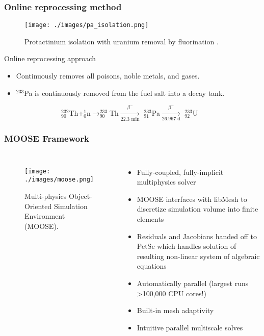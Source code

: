 \begin{frame}
  \frametitle{Online reprocessing method}
     \begin{figure}[t]
                \vspace*{-0.1in}
                \texttt{[image: ./images/pa\_isolation.png]}
                \vspace*{-0.09in}
                \caption{Protactinium isolation with uranium removal by fluorination \cite{robertson_conceptual_1971}.}
      \end{figure}
                      \vspace*{-0.22in}
             \begin{block}{Online reprocessing approach}
               \begin{itemize}             
               \item Continuously removes all poisons, noble metals, and gases.
               \item $^{233}$Pa is continuously removed from the fuel salt into a decay tank.
               \end{itemize}
               \end{block}
               \vspace{-0.05in}
$\qquad\qquad\qquad\qquad^{232}_{90}$Th+$^1_0$n$\rightarrow^{233}_{90}$Th$\xrightarrow[\text{22.3 min}]{\beta^-}$ $^{233}_{91}$Pa$\xrightarrow[\text{26.967 d}]{\beta^-}$ $^{233}_{92}$U
\end{frame}

\begin{frame}
  \frametitle{MOOSE Framework}
  \begin{columns}
    \column[t]{6cm}
  \begin{figure}[t]
     \vspace{-0.25in}
       \hspace*{-0.25in}
       \texttt{[image: ./images/moose.png]}
            \caption{Multi-physics Object-Oriented Simulation Environment (MOOSE).}
  \end{figure}
	\column[t]{6cm}
               \begin{itemize}      
	       \item Fully-coupled, fully-implicit multiphysics solver      
               \item MOOSE interfaces with libMesh to discretize simulation volume into finite elements
               \item Residuals and Jacobians handed off to PetSc which handles solution of resulting non-linear system of algebraic equations
	       \item Automatically parallel (largest runs \textgreater 100,000 CPU cores!)
	       \item Built-in mesh adaptivity
	       \item Intuitive parallel multiscale solves
               \end{itemize}

  \end{columns}
\end{frame}

